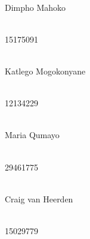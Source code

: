 \begin{titlepage}
\begin{center}
		
		\begin{minipage}{0.4\textwidth}
			\begin{flushleft} \large
				\emph{} \\
				Dimpho {Mahoko}
			\end{flushleft}
		\end{minipage}
		\begin{minipage}{0.4\textwidth}
			\begin{flushright} \large
				\emph{} \\
				15175091
			\end{flushright}
		\end{minipage}

		\begin{minipage}{0.4\textwidth}
			\begin{flushleft} \large
				\emph{} \\
				Katlego {Mogokonyane}
			\end{flushleft}
		\end{minipage}
		\begin{minipage}{0.4\textwidth}
			\begin{flushright} \large
				\emph{} \\
				12134229
			\end{flushright}
		\end{minipage}

		\begin{minipage}{0.4\textwidth}
			\begin{flushleft} \large
				\emph{} \\
				Maria {Qumayo}
			\end{flushleft}
		\end{minipage}
		\begin{minipage}{0.4\textwidth}
			\begin{flushright} \large
				\emph{} \\
				29461775
			\end{flushright}
		\end{minipage}

		\begin{minipage}{0.4\textwidth}
			\begin{flushleft} \large
				\emph{} \\
				Craig van Heerden
			\end{flushleft}
		\end{minipage}
		\begin{minipage}{0.4\textwidth}
			\begin{flushright} \large
				\emph{} \\
				15029779
			\end{flushright}
		\end{minipage}


\end{center}
\end{titlepage}

